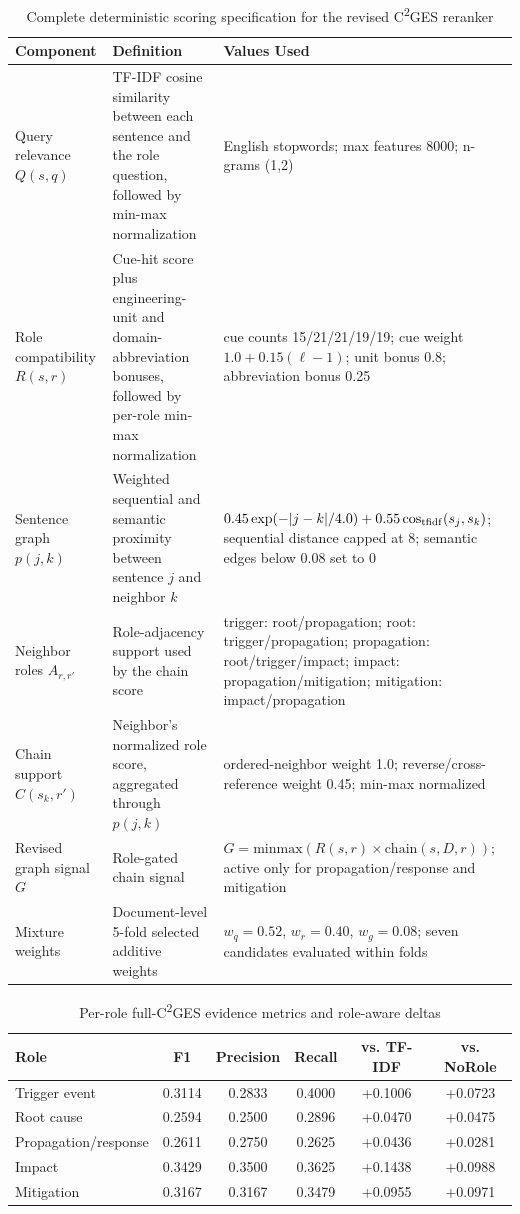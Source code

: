 \documentclass[11pt,letterpaper]{article}
\newcommand{\cges}{C\textsuperscript{2}GES}
\begin{document}
\begin{table}[ht]
\centering
\footnotesize
\caption{Complete deterministic scoring specification for the revised \cges{} reranker}
\begin{tabular}{p{2.7cm}p{6.0cm}p{6.0cm}}
\toprule
\textbf{Component} & \textbf{Definition} & \textbf{Values Used} \\
\midrule
Query relevance $Q(s,q)$ & TF-IDF cosine similarity between each sentence and the role question, followed by min-max normalization & English stopwords; max features 8000; n-grams (1,2) \\
Role compatibility $R(s,r)$ & Cue-hit score plus engineering-unit and domain-abbreviation bonuses, followed by per-role min-max normalization & cue counts 15/21/21/19/19; cue weight $1.0+0.15(\ell-1)$; unit bonus 0.8; abbreviation bonus 0.25 \\
Sentence graph $p(j,k)$ & Weighted sequential and semantic proximity between sentence $j$ and neighbor $k$ & $0.45\exp(-|j-k|/4.0)+0.55\cos_{\rm tfidf}(s_j,s_k)$; sequential distance capped at 8; semantic edges below 0.08 set to 0 \\
Neighbor roles $A_{r,r'}$ & Role-adjacency support used by the chain score & trigger: root/propagation; root: trigger/propagation; propagation: root/trigger/impact; impact: propagation/mitigation; mitigation: impact/propagation \\
Chain support $C(s_k,r')$ & Neighbor's normalized role score, aggregated through $p(j,k)$ & ordered-neighbor weight 1.0; reverse/cross-reference weight 0.45; min-max normalized \\
Revised graph signal $G$ & Role-gated chain signal & $G=\mathrm{minmax}(R(s,r)\times\mathrm{chain}(s,D,r))$; active only for propagation/response and mitigation \\
Mixture weights & Document-level 5-fold selected additive weights & $w_q=0.52$, $w_r=0.40$, $w_g=0.08$; seven candidates evaluated within folds \\
\bottomrule
\end{tabular}
\end{table}

\begin{table}[ht]
\centering
\small
\caption{Per-role full-\cges{} evidence metrics and role-aware deltas}
\begin{tabular}{lccccc}
\toprule
\textbf{Role} & \textbf{F1} & \textbf{Precision} & \textbf{Recall} & \textbf{vs. TF-IDF} & \textbf{vs. NoRole} \\
\midrule
Trigger event & 0.3114 & 0.2833 & 0.4000 & +0.1006 & +0.0723 \\
Root cause & 0.2594 & 0.2500 & 0.2896 & +0.0470 & +0.0475 \\
Propagation/response & 0.2611 & 0.2750 & 0.2625 & +0.0436 & +0.0281 \\
Impact & 0.3429 & 0.3500 & 0.3625 & +0.1438 & +0.0988 \\
Mitigation & 0.3167 & 0.3167 & 0.3479 & +0.0955 & +0.0971 \\
\bottomrule
\end{tabular}
\end{table}
\end{document}
